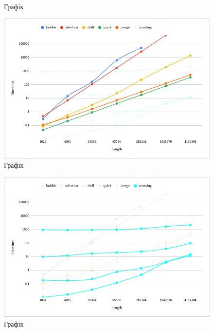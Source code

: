 \documentclass{article}
\begin{document}
\begin{normalsize}
\begin{figure}[H]
			\caption{Графік}
		\end{figure}
	
		\begin{figure}[H]
			\centering
			\includegraphics[scale=0.5]{2}	
			\caption{Графік}
		\end{figure}
		
		\begin{figure}[H]
			\centering
			\includegraphics[scale=0.5]{3}	
			\caption{Графік}
		\end{figure}
		

\end{normalsize}
\end{document}
